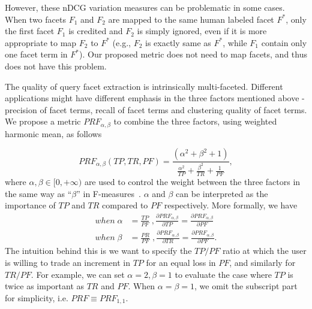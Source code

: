 However, these nDCG variation measures can be problematic in some cases.
When two facets $F_1$ and $F_2$ are mapped to the same human labeled facet $F^*$, only the first facet $F_1$ is credited and $F_2$ is simply ignored, even if it is more appropriate to map $F_2$ to $F^*$ (e.g., $F_2$ is exactly same as $F^*$, while $F_1$ contain only one facet term in $F^*$). Our proposed metric does not need to map facets, and thus does not have this problem.

The quality of query facet extraction is intrinsically multi-faceted. Different applications might have different emphasis in the three factors mentioned above - precision of facet terms, recall of facet terms 
and clustering quality of facet terms. We propose a metric $PRF_{\alpha,\beta}$ to combine the three factors, using weighted harmonic mean, as follows

\begin{equation}
\label{eq:prf}
 P\!R\!F_{\alpha,\beta}(T\!P, T\!R, P\!F) = \frac{(\alpha^2 + \beta^2 + 1)}{\frac{\alpha^2}{T\!P} + \frac{\beta^2}{T\!R} + \frac{1}{P\!F}},
\end{equation}
where $\alpha,\beta \in [0,+\infty)$ are used to control the weight between the three factors in the same way as ``$\beta$'' in F-measures~\cite{van1979information}. $\alpha$ and $\beta$ can be interpreted as the importance of $T\!P$ and $T\!R$ compared to $P\!F$ respectively. More formally, we have 
\begin{equation}
\begin{split} 
 when\; \alpha &= \frac{T\!P}{P\!F} \;, \frac{\partial P\!R\!F_{\alpha,\beta}}{\partial T\!P} = \frac{\partial P\!R\!F_{\alpha,\beta}}{\partial P\!F}\\
 when\; \beta &= \frac{P\!R}{P\!F} \;, \frac{\partial P\!R\!F_{\alpha,\beta}}{\partial T\!R} = \frac{\partial P\!R\!F_{\alpha,\beta}}{\partial P\!F}.
\end{split}
\end{equation}
The intuition behind this is we want to specify the $T\!P/P\!F$ ratio at which the user is willing to trade an increment in $T\!P$ for an equal loss in $P\!F$, and similarly for $T\!R/P\!F$. For example, we can set $\alpha\!=\!2,\beta\!=\!1$ to evaluate the case where $T\!P$ is twice as important as $T\!R$ and $P\!F$. When $\alpha \!=\! \beta \!=\! 1$, we omit the subscript part for simplicity, i.e. $PRF \equiv PRF_{1,1}$.


